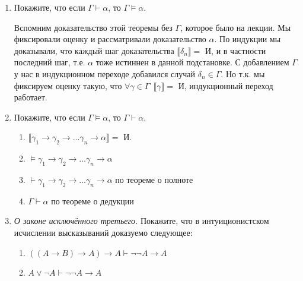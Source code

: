

\cfoot{}




\begin{enumerate}
    \item Покажите, что если $\Gamma \vdash \alpha$, то $\Gamma \models \alpha$.

          Вспомним доказательство этой теоремы без \(\Gamma\), которое было на лекции. Мы фиксировали оценку и рассматривали доказательство \(\alpha\). По индукции мы доказывали, что каждый шаг доказательства \(\llbracket \delta_n \rrbracket =\) И, и в частности последний шаг, т.е. \(\alpha\) тоже истиннен в данной подстановке. С добавлением \(\Gamma\) у нас в индукционном переходе добавился случай \(\delta_n \in \Gamma\). Но т.к. мы фиксируем оценку такую, что \(\forall \gamma \in \Gamma \ \ \llbracket \gamma \rrbracket =\) И, индукционный переход работает.

    \item Покажите, что если $\Gamma \models \alpha$, то $\Gamma \vdash \alpha$.

          \begin{enumerate}
              \item \(\llbracket \gamma_1 \to \gamma_2 \to \dots \gamma_n \to \alpha \rrbracket =\) И.
              \item \(\models \gamma_1 \to \gamma_2 \to \dots \gamma_n \to \alpha\)
              \item \(\vdash \gamma_1 \to \gamma_2 \to \dots \gamma_n \to \alpha\) по теореме о полноте
              \item \(\Gamma \vdash \alpha\) по теореме о дедукции
          \end{enumerate}

    \item \emph{О законе исключённого третьего.} Покажите, что в интуиционистском исчислении высказываний
          доказуемо следующее:

          \begin{enumerate}
              \item $((A\rightarrow B)\rightarrow A)\rightarrow A \vdash \neg\neg A \rightarrow A$
              \item $A \vee \neg A \vdash \neg\neg A \rightarrow A$


\end{enumerate}
\end{enumerate}

